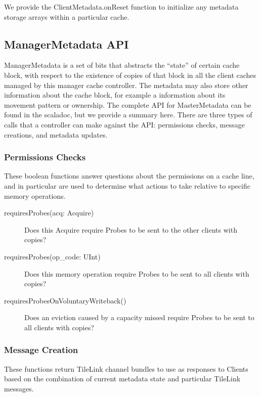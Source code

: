 We provide the ClientMetadata.onReset function to initialize any metadata storage arrays within a particular cache.

\subsection{ManagerMetadata API} 

ManagerMetadata is a set of bits that abstracts the “state” of certain cache block,
with respect to the existence of copies of that block in all the client caches
managed by this manager cache controller.
The metadata may also store other information about the cache block,
for example a information about its movement pattern or ownership.
The complete API for MasterMetadata can be found in the scaladoc,
but we provide a summary here.
There are three types of calls that a controller can make against the API:
permissions checks, message creations, and metadata updates.

\subsubsection{Permissions Checks}

These boolean functions answer questions about the permissions on a cache line, and in particular are used to determine what actions to take relative to specific memory operations.

\begin{description}
\item[requiresProbes(acq: Acquire) ]
Does this Acquire require Probes to be sent to the other clients with copies?
\item[requiresProbes(op\_code: UInt) ]
Does this memory operation require Probes to be sent to all clients with copies?
\item[requiresProbesOnVoluntaryWriteback() ]
 Does an eviction caused by a capacity missed require Probes to be sent to all clients with copies?
\end{description}

\subsubsection{Message Creation}

These functions return TileLink channel bundles to use as responses to Clients based on the combination of current metadata state and particular TileLink messages.

